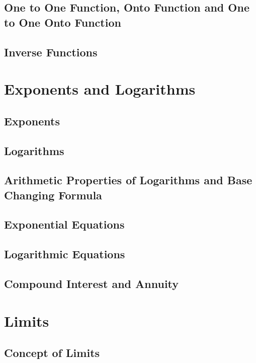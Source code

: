 \documentclass{report}
\begin{document}
\begin{multicols}{2}
  \section{One to One Function, Onto Function and One to One Onto Function}

  \section{Inverse Functions}

  \chapter{Exponents and Logarithms}

  \section{Exponents}

  \section{Logarithms}

  \section{Arithmetic Properties of Logarithms and Base Changing Formula}

  \section{Exponential Equations}

  \section{Logarithmic Equations}

  \section{Compound Interest and Annuity}

  \chapter{Limits}

  \section{Concept of Limits}


\end{multicols}
\end{document}
